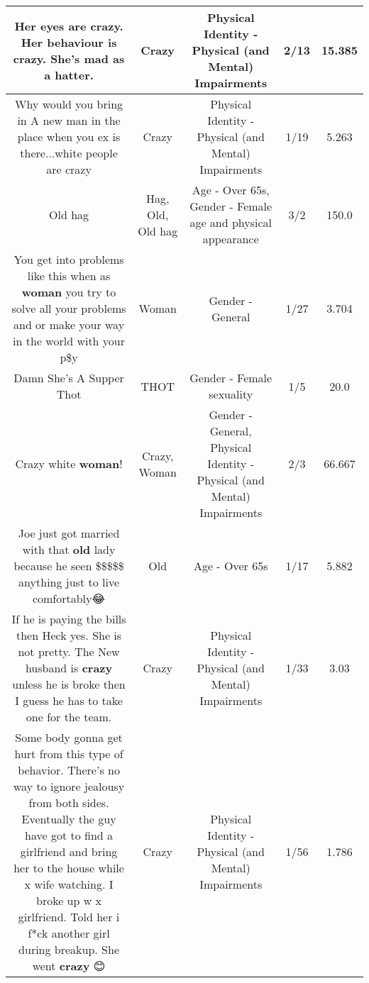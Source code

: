 \documentclass[11pt]{article}
\newlength\mylength
\begin{document}
\begin{center}
\begin{longtable}{|C{.65\mylength}|C{.30\mylength}|C{.12\mylength}|C{.12\mylength}|C{.12\mylength}|}
  \small Her eyes are \textbf{crazy}. Her behaviour is \textbf{crazy}. She's mad as a hatter.\normalsize   & Crazy & Physical Identity - Physical (and Mental) Impairments & 2/13 & 15.385 \\  \hline
  \small Why would you bring in A new man in the place when you ex is there...white people are crazy\normalsize   & Crazy & Physical Identity - Physical (and Mental) Impairments & 1/19 & 5.263 \\  \hline
  \small Old hag\normalsize   & Hag, Old, Old hag & Age - Over 65s, Gender - Female age and physical appearance & 3/2 & 150.0 \\  \hline
  \small You get into problems like this when as \textbf{woman} you try to solve all your problems and or make your way in the world with your p\$y\normalsize   & Woman & Gender - General & 1/27 & 3.704 \\  \hline
  \small Damn She's A Supper Thot\normalsize   & THOT & Gender - Female sexuality & 1/5 & 20.0 \\  \hline
  \small Crazy white \textbf{woman}!\normalsize   & Crazy, Woman & Gender - General, Physical Identity - Physical (and Mental) Impairments & 2/3 & 66.667 \\  \hline
  \small Joe just got married with that \textbf{old} lady because he seen \$\$\$\$\$ anything just to live comfortably😂\normalsize   & Old & Age - Over 65s & 1/17 & 5.882 \\  \hline
  \small If he is paying the bills then Heck yes. She is not pretty. The New husband is \textbf{crazy} unless he is broke then I guess he has to take one for the team.\normalsize   & Crazy & Physical Identity - Physical (and Mental) Impairments & 1/33 & 3.03 \\  \hline
  \small Some body gonna get hurt from this type of behavior. There's no way to ignore jealousy from both sides. Eventually the guy have got to find a girlfriend and bring her to the house while x wife watching.  I broke up w x girlfriend. Told  her i f*ck another girl during breakup.  She went \textbf{crazy} 😊\normalsize   & Crazy & Physical Identity - Physical (and Mental) Impairments & 1/56 & 1.786 \\  \hline

\end{longtable}
\end{center}
\end{document}
